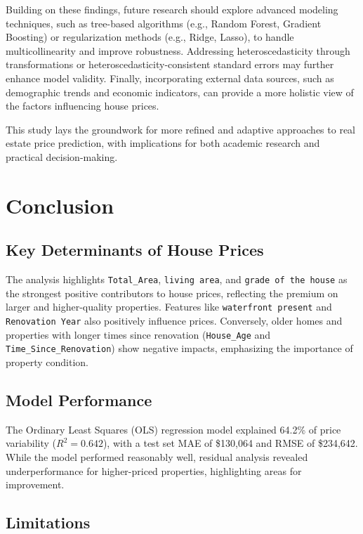 \documentclass[11pt]{article}
\begin{document}
Building on these findings, future research should explore advanced modeling techniques, such as tree-based algorithms (e.g., Random Forest, Gradient Boosting) or regularization methods (e.g., Ridge, Lasso), to handle multicollinearity and improve robustness. Addressing heteroscedasticity through transformations or heteroscedasticity-consistent standard errors may further enhance model validity. Finally, incorporating external data sources, such as demographic trends and economic indicators, can provide a more holistic view of the factors influencing house prices.

This study lays the groundwork for more refined and adaptive approaches to real estate price prediction, with implications for both academic research and practical decision-making.

\section{Conclusion}

\subsection{Key Determinants of House Prices}

The analysis highlights \texttt{Total\_Area}, \texttt{living area}, and \texttt{grade of the house} as the strongest positive contributors to house prices, reflecting the premium on larger and higher-quality properties. Features like \texttt{waterfront present} and \texttt{Renovation Year} also positively influence prices. Conversely, older homes and properties with longer times since renovation (\texttt{House\_Age} and \texttt{Time\_Since\_Renovation}) show negative impacts, emphasizing the importance of property condition.

\subsection{Model Performance}

The Ordinary Least Squares (OLS) regression model explained 64.2\% of price variability (\(R^2 = 0.642\)), with a test set MAE of \$130,064 and RMSE of \$234,642. While the model performed reasonably well, residual analysis revealed underperformance for higher-priced properties, highlighting areas for improvement.

\subsection{Limitations}
\end{document}
